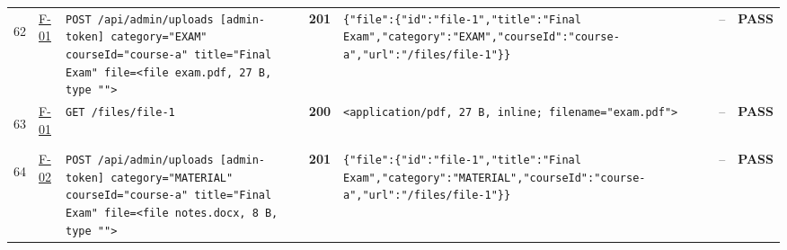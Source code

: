\documentclass[10pt,a4paper]{article}
\begin{document}
\begin{landscape}
\begin{longtable}{@{}P{0.6cm}P{0.9cm}P{8.5cm}P{1.0cm}P{6.2cm}P{4.2cm}P{1.1cm}@{}}
\hypertarget{call62}{62} & \hyperlink{test-F-01}{F-01} & \texttt{POST /\allowbreak{}api/\allowbreak{}admin/\allowbreak{}uploads [admin-\allowbreak{}token] category=\allowbreak{}"\allowbreak{}EXAM"\allowbreak{} courseId=\allowbreak{}"\allowbreak{}course-\allowbreak{}a"\allowbreak{} title=\allowbreak{}"\allowbreak{}Final Exam"\allowbreak{} file=\allowbreak{}<file exam.\allowbreak{}pdf,\allowbreak{} 27 B,\allowbreak{} type "\allowbreak{}"\allowbreak{}>} & \textcolor{passgreen}{\textbf{201}} & \texttt{\{"\allowbreak{}file"\allowbreak{}:\allowbreak{}\{"\allowbreak{}id"\allowbreak{}:\allowbreak{}"\allowbreak{}file-\allowbreak{}1"\allowbreak{},\allowbreak{}"\allowbreak{}title"\allowbreak{}:\allowbreak{}"\allowbreak{}Final Exam"\allowbreak{},\allowbreak{}"\allowbreak{}category"\allowbreak{}:\allowbreak{}"\allowbreak{}EXAM"\allowbreak{},\allowbreak{}"\allowbreak{}courseId"\allowbreak{}:\allowbreak{}"\allowbreak{}course-\allowbreak{}a"\allowbreak{},\allowbreak{}"\allowbreak{}url"\allowbreak{}:\allowbreak{}"\allowbreak{}/\allowbreak{}files/\allowbreak{}file-\allowbreak{}1"\allowbreak{}\}\}} & -- & \textcolor{passgreen}{\textbf{PASS}} \\
\hypertarget{call63}{63} & \hyperlink{test-F-01}{F-01} & \texttt{GET /\allowbreak{}files/\allowbreak{}file-\allowbreak{}1} & \textcolor{passgreen}{\textbf{200}} & \texttt{<application/\allowbreak{}pdf,\allowbreak{} 27 B,\allowbreak{} inline; filename=\allowbreak{}"\allowbreak{}exam.\allowbreak{}pdf"\allowbreak{}>} & -- & \textcolor{passgreen}{\textbf{PASS}} \\
\hypertarget{call64}{64} & \hyperlink{test-F-02}{F-02} & \texttt{POST /\allowbreak{}api/\allowbreak{}admin/\allowbreak{}uploads [admin-\allowbreak{}token] category=\allowbreak{}"\allowbreak{}MATERIAL"\allowbreak{} courseId=\allowbreak{}"\allowbreak{}course-\allowbreak{}a"\allowbreak{} title=\allowbreak{}"\allowbreak{}Final Exam"\allowbreak{} file=\allowbreak{}<file notes.\allowbreak{}docx,\allowbreak{} 8 B,\allowbreak{} type "\allowbreak{}"\allowbreak{}>} & \textcolor{passgreen}{\textbf{201}} & \texttt{\{"\allowbreak{}file"\allowbreak{}:\allowbreak{}\{"\allowbreak{}id"\allowbreak{}:\allowbreak{}"\allowbreak{}file-\allowbreak{}1"\allowbreak{},\allowbreak{}"\allowbreak{}title"\allowbreak{}:\allowbreak{}"\allowbreak{}Final Exam"\allowbreak{},\allowbreak{}"\allowbreak{}category"\allowbreak{}:\allowbreak{}"\allowbreak{}MATERIAL"\allowbreak{},\allowbreak{}"\allowbreak{}courseId"\allowbreak{}:\allowbreak{}"\allowbreak{}course-\allowbreak{}a"\allowbreak{},\allowbreak{}"\allowbreak{}url"\allowbreak{}:\allowbreak{}"\allowbreak{}/\allowbreak{}files/\allowbreak{}file-\allowbreak{}1"\allowbreak{}\}\}} & -- & \textcolor{passgreen}{\textbf{PASS}} \\

\end{longtable}
\end{landscape}
\end{document}

